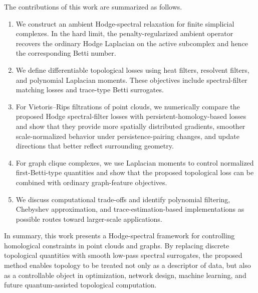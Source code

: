 \documentclass[pdflatex,sn-mathphys-ay]{sn-jnl}%
\theoremstyle{thmstyleone}%
\theoremstyle{thmstyletwo}%
\theoremstyle{thmstylethree}%
\begin{document}
The contributions of this work are summarized as follows.
\begin{enumerate}
    \item We construct an ambient Hodge-spectral relaxation for finite simplicial complexes. In the hard limit, the penalty-regularized ambient operator recovers the ordinary Hodge Laplacian on the active subcomplex and hence the corresponding Betti number.

    \item We define differentiable topological losses using heat filters, resolvent filters, and polynomial Laplacian moments. These objectives include spectral-filter matching losses and trace-type Betti surrogates.

    \item For Vietoris--Rips filtrations of point clouds, we numerically compare the proposed Hodge spectral-filter losses with persistent-homology-based losses and show that they provide more spatially distributed gradients, smoother scale-normalized behavior under persistence-pairing changes, and update directions that better reflect surrounding geometry.

    \item For graph clique complexes, we use Laplacian moments to control normalized first-Betti-type quantities and show that the proposed topological loss can be combined with ordinary graph-feature objectives.

    \item We discuss computational trade-offs and identify polynomial filtering, Chebyshev approximation, and trace-estimation-based implementations as possible routes toward larger-scale applications.
\end{enumerate}

In summary, this work presents a Hodge-spectral framework for controlling homological constraints in point clouds and graphs. By replacing discrete topological quantities with smooth low-pass spectral surrogates, the proposed method enables topology to be treated not only as a descriptor of data, but also as a controllable object in optimization, network design, machine learning, and future quantum-assisted topological computation.




\end{document}
